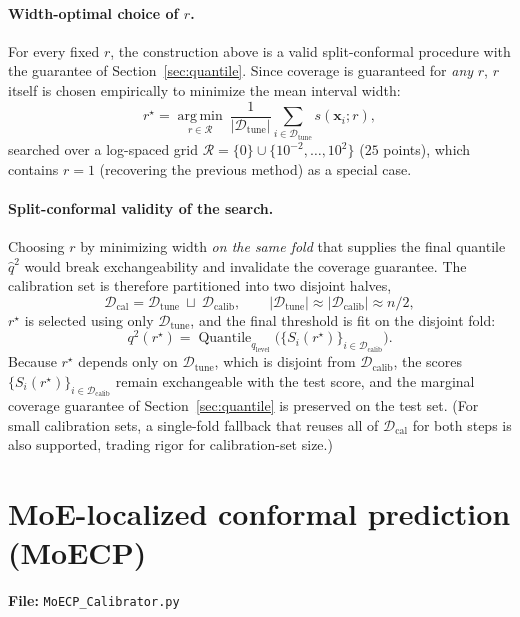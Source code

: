 \documentclass[11pt]{article}
\begin{document}
\paragraph{Width-optimal choice of $r$.} For every fixed $r$, the construction above is a valid
split-conformal procedure with the guarantee of Section~\ref{sec:quantile}. Since coverage is
guaranteed for \emph{any} $r$, $r$ itself is chosen empirically to minimize the mean interval width:
\begin{equation}
r^\star = \operatorname*{arg\,min}_{r \in \mathcal{R}} \
\frac{1}{|\mathcal{D}_{\mathrm{tune}}|}\sum_{i \in \mathcal{D}_{\mathrm{tune}}} s(\bm{x}_i; r),
\end{equation}
searched over a log-spaced grid $\mathcal{R} = \{0\} \cup \{10^{-2}, \dots, 10^{2}\}$ ($25$
points), which contains $r=1$ (recovering the previous method) as a special case.

\paragraph{Split-conformal validity of the search.} Choosing $r$ by minimizing width \emph{on the
same fold} that supplies the final quantile $\hat{q}^2$ would break exchangeability and invalidate
the coverage guarantee. The calibration set is therefore partitioned into two disjoint halves,
\begin{equation}
\mathcal{D}_{\mathrm{cal}} = \mathcal{D}_{\mathrm{tune}} \ \sqcup\ \mathcal{D}_{\mathrm{calib}},
\qquad |\mathcal{D}_{\mathrm{tune}}| \approx |\mathcal{D}_{\mathrm{calib}}| \approx n/2,
\end{equation}
$r^\star$ is selected using only $\mathcal{D}_{\mathrm{tune}}$, and the final threshold is fit on
the disjoint fold:
\begin{equation}
q^2(r^\star) = \operatorname{Quantile}_{q_{\mathrm{level}}}\big(\{S_i(r^\star)\}_{i \in
\mathcal{D}_{\mathrm{calib}}}\big).
\end{equation}
Because $r^\star$ depends only on $\mathcal{D}_{\mathrm{tune}}$, which is disjoint from
$\mathcal{D}_{\mathrm{calib}}$, the scores $\{S_i(r^\star)\}_{i\in \mathcal{D}_{\mathrm{calib}}}$
remain exchangeable with the test score, and the marginal coverage guarantee of
Section~\ref{sec:quantile} is preserved on the test set. (For small calibration sets, a single-fold
fallback that reuses all of $\mathcal{D}_{\mathrm{cal}}$ for both steps is also supported, trading
rigor for calibration-set size.)

\section{MoE-localized conformal prediction (MoECP)}
\label{sec:moecp}
\textbf{File:} \texttt{MoECP\_Calibrator.py}
\end{document}
